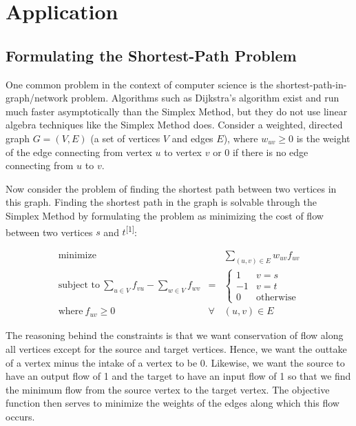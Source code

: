 \section{Application}

\subsection{Formulating the Shortest-Path Problem} \label{app:formulating}

One common problem in the context of computer science is the shortest-path-in-graph/network problem. Algorithms such as Dijkstra's algorithm exist and run much faster asymptotically than the Simplex Method, but they do not use linear algebra techniques like the Simplex Method does. Consider a weighted, directed graph $G = (V,E)$ (a set of vertices $V$ and edges $E$), where $w_{uv} \geq 0$ is the weight of the edge connecting from vertex $u$ to vertex $v$ or 0 if there is no edge connecting from $u$ to $v$.

Now consider the problem of finding the shortest path between two vertices in this graph. Finding the shortest path in the graph is solvable through the Simplex Method by formulating the problem as minimizing the cost of flow between two vertices $s$ and $t$\textsuperscript{[1]}:

\begin{equation}
    \begin{array}{rcl}
        \text{minimize}\ & & \sum_{(u,v) \in E} w_{uv} f_{uv} \\
        \text{subject to}\ \sum_{u \in V} f_{vu} - \sum_{w \in V} f_{wv} & = &
        \begin{cases} 
            1 & v = s \\
            -1 & v = t \\
            0 & \text{otherwise}
        \end{cases} \\
        \text{where}\ f_{uv} \geq 0 & \forall & (u,v) \in E
    \end{array}
\end{equation}

The reasoning behind the constraints is that we want conservation of flow along all vertices except for the source and target vertices. Hence, we want the outtake of a vertex minus the intake of a vertex to be 0. Likewise, we want the source to have an output flow of 1 and the target to have an input flow of 1 so that we find the minimum flow from the source vertex to the target vertex. The objective function then serves to minimize the weights of the edges along which this flow occurs.

